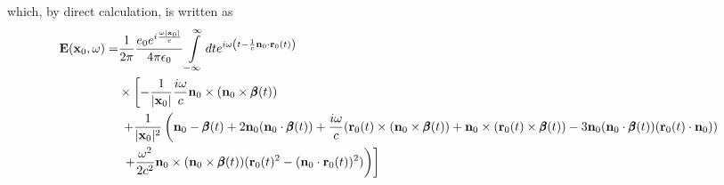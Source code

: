 which, by direct calculation, is written as
\begin{align}
    {\bf E}({\bf x}_0,\omega) = & \frac1{2\pi}\frac{e_0 e^{i\frac{\omega|{\bf x}_0|}c}}{4\pi\epsilon_0}\int\limits_{-\infty}^{\infty}dte^{i\omega\left( t-\frac1c{\bf n}_0\cdot{\bf r}_0(t)\right)}\nonumber                                                                                                                                                         \\
                                & \times\left[-\frac{1}{|{\bf x}_0|}\frac{i\omega}c{\bf n}_0\times({\bf n}_0\times{\pmb \beta}(t))\right.\nonumber                                                                                                                                                                                                                   \\
                                & \left.\,+\frac1{|{\bf x}_0|^2}\left({\bf n}_0-{\pmb \beta }(t) +2 {\bf n}_0({\bf n}_0\cdot{\pmb \beta}(t)  ) + \frac{i\omega}c({\bf r}_0(t)\times({\bf n}_0\times{\pmb \beta}(t))+{\bf n}_0\times({\bf r}_0(t)\times{\pmb \beta}(t))-3{\bf n}_0({\bf n}_0\cdot{\pmb \beta}(t))({\bf r}_0(t)\cdot{\bf n}_0))\right.\right.\nonumber \\
                                & \left.\left.\,+\frac{\omega^2}{2c^2}{\bf n}_0\times({\bf n}_0\times{\pmb \beta}(t))({\bf r}_0(t)^2 - ({\bf n}_0\cdot{\bf r}_0(t))^2)\right)\right]
\end{align}

